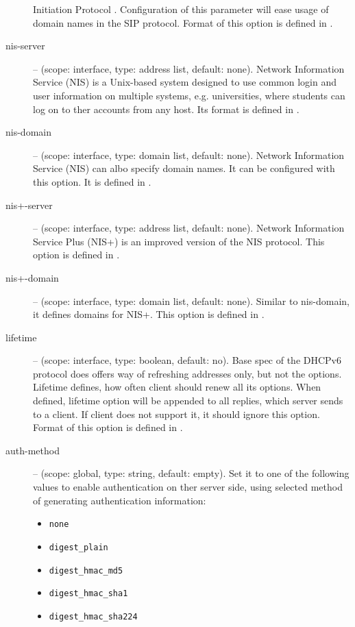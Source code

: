 \begin{description}
	    Initiation Protocol \cite{rfc3263}. Configuration of this
	    parameter will ease usage of domain names in the SIP
	    protocol. Format of this option is defined in
	    \cite{rfc3319}.
 \item[nis-server] -- (scope: interface, type: address list, default:
	    none). Network Information Service (NIS) is a Unix-based
	    system designed to use common login and user information on
	    multiple systems, e.g. universities, where students can log
	    on to ther accounts from any host. Its format is defined
            in \cite{rfc3898}.
 \item[nis-domain] -- (scope: interface, type: domain list, default:
	    none). Network Information Service (NIS) can albo specify
	    domain names. It can be configured with this option. It is
	    defined in \cite{rfc3898}.
 \item[nis+-server] -- (scope: interface, type: address list, default:
	    none). Network Information Service Plus (NIS+) is an
	    improved version of the NIS protocol. This option is defined
	    in \cite{rfc3898}.
 \item[nis+-domain] -- (scope: interface, type: domain list, default:
	    none). Similar to nis-domain, it defines domains for
	    NIS+. This option is defined in \cite{rfc3898}.
 \item[lifetime] -- (scope: interface, type: boolean, default: no). Base
	    spec of the DHCPv6 protocol does offers way of refreshing
	    addresses only, but not the options. Lifetime defines, how
	    often client should renew all its options. When defined,
            lifetime option will be appended to all replies, which
            server sends to a client. If client does not support it,
            it should ignore this option. Format of
	    this option is defined in \cite{draft-lifetime}.
 \item[auth-method] -- (scope: global, type: string, default: empty). Set
            it to one of the following values to enable authentication
            on ther server side, using selected method of generating
            authentication information:
            \begin{itemize}
             \item \texttt{none}
             \item \texttt{digest\_plain}
             \item \texttt{digest\_hmac\_md5}
             \item \texttt{digest\_hmac\_sha1}
             \item \texttt{digest\_hmac\_sha224}

\end{itemize}
\end{description}
